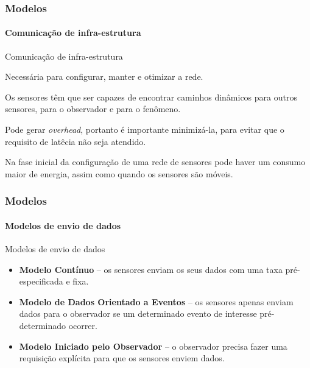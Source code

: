 \documentclass[notes]{beamer}
\begin{document}
\begin{frame}
\label{slide_61}
\frametitle{Modelos}
\framesubtitle{Comunicação de infra-estrutura}

\begin{block}{Comunicação de infra-estrutura}

Necessária para configurar, manter e otimizar a rede.

\end{block} \pause

\begin{block}

Os sensores têm que ser capazes de encontrar caminhos dinâmicos para outros sensores, para o observador e para o fenômeno.

\end{block} \pause

\begin{block}

Pode gerar \textit{overhead}, portanto é importante minimizá-la, para evitar que o requisito de latêcia não seja atendido. 

\end{block} \pause

\begin{block}

Na fase inicial da configuração de uma rede de sensores pode haver um consumo maior de energia, assim como quando os sensores são móveis. 

\end{block}

\end{frame}

\begin{frame}
\label{slide_62}
\frametitle{Modelos}
\framesubtitle{Modelos de envio de dados}

\begin{block}{Modelos de envio de dados}

\begin{itemize}

\item \textbf{Modelo Contínuo} – os sensores enviam os seus dados com uma taxa pré-especificada e fixa. \pause
\item \textbf{Modelo de Dados Orientado a Eventos} – os sensores apenas enviam dados para o observador se um determinado evento de interesse pré-determinado ocorrer. \pause
\item \textbf{Modelo Iniciado pelo Observador} – o observador precisa fazer uma requisição explícita para que os sensores enviem dados. 

\end{itemize}
\end{block}

\end{frame}
\end{document}
